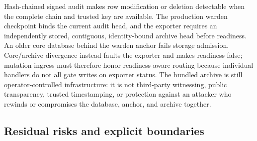 \documentclass[10pt]{article}
\begin{document}
Hash-chained signed audit makes row modification or deletion detectable when the complete chain
and trusted key are available. The production warden checkpoint binds the current audit head, and
the exporter requires an independently stored, contiguous, identity-bound archive head before
readiness. An older core database behind the warden anchor fails storage admission. Core/archive
divergence instead faults the exporter and makes readiness false; mutation ingress must therefore
honor readiness-aware routing because individual handlers do not all gate writes on exporter
status. The bundled archive is still operator-controlled infrastructure: it is not third-party
witnessing, public transparency, trusted timestamping, or protection against an attacker who
rewinds or compromises the database, anchor, and archive together.

\subsection{Residual risks and explicit boundaries}
\end{document}

